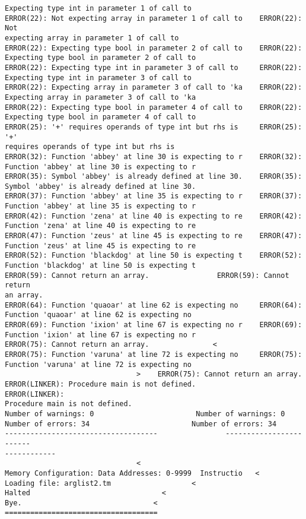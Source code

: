 \documentclass[12pt]{book}
\begin{document}
\begin{lstlisting}
Expecting type int in parameter 1 of call to 
ERROR(22): Not expecting array in parameter 1 of call to    ERROR(22): Not 
expecting array in parameter 1 of call to
ERROR(22): Expecting type bool in parameter 2 of call to    ERROR(22): 
Expecting type bool in parameter 2 of call to
ERROR(22): Expecting type int in parameter 3 of call to     ERROR(22): 
Expecting type int in parameter 3 of call to 
ERROR(22): Expecting array in parameter 3 of call to 'ka    ERROR(22): 
Expecting array in parameter 3 of call to 'ka
ERROR(22): Expecting type bool in parameter 4 of call to    ERROR(22): 
Expecting type bool in parameter 4 of call to
ERROR(25): '+' requires operands of type int but rhs is     ERROR(25): '+' 
requires operands of type int but rhs is 
ERROR(32): Function 'abbey' at line 30 is expecting to r    ERROR(32): 
Function 'abbey' at line 30 is expecting to r
ERROR(35): Symbol 'abbey' is already defined at line 30.    ERROR(35): 
Symbol 'abbey' is already defined at line 30.
ERROR(37): Function 'abbey' at line 35 is expecting to r    ERROR(37): 
Function 'abbey' at line 35 is expecting to r
ERROR(42): Function 'zena' at line 40 is expecting to re    ERROR(42): 
Function 'zena' at line 40 is expecting to re
ERROR(47): Function 'zeus' at line 45 is expecting to re    ERROR(47): 
Function 'zeus' at line 45 is expecting to re
ERROR(52): Function 'blackdog' at line 50 is expecting t    ERROR(52): 
Function 'blackdog' at line 50 is expecting t
ERROR(59): Cannot return an array.                ERROR(59): Cannot return 
an array.
ERROR(64): Function 'quaoar' at line 62 is expecting no     ERROR(64): 
Function 'quaoar' at line 62 is expecting no 
ERROR(69): Function 'ixion' at line 67 is expecting no r    ERROR(69): 
Function 'ixion' at line 67 is expecting no r
ERROR(75): Cannot return an array.               <
ERROR(75): Function 'varuna' at line 72 is expecting no     ERROR(75): 
Function 'varuna' at line 72 is expecting no 
                               >    ERROR(75): Cannot return an array.
ERROR(LINKER): Procedure main is not defined.            ERROR(LINKER): 
Procedure main is not defined.
Number of warnings: 0                        Number of warnings: 0
Number of errors: 34                        Number of errors: 34
------------------------------------                ------------------------
------------
                               <
Memory Configuration: Data Addresses: 0-9999  Instructio   <
Loading file: arglist2.tm                   <
Halted                               <
Bye.                               <
====================================

\end{lstlisting}
\end{document}

